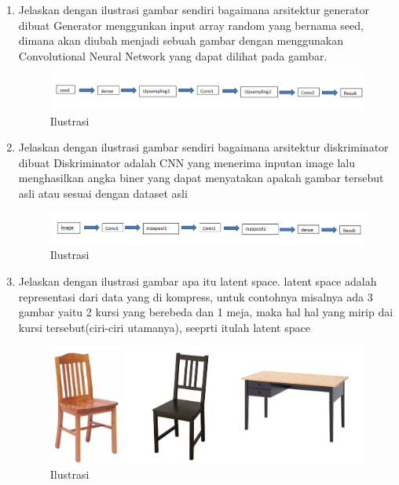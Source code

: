 \begin{enumerate}
\item Jelaskan dengan ilustrasi gambar sendiri bagaimana arsitektur generator dibuat
Generator menggunkan input array random yang bernama seed, dimana akan diubah menjadi sebuah gambar dengan menggunakan Convolutional Neural Network yang dapat dilihat pada gambar.
\begin{figure}[ht]
\centering
\includegraphics[scale=0.4]{figures/1174042/chapter8/3.PNG}
\caption{Ilustrasi}
\label{Contoh}
\end{figure}


\item Jelaskan dengan ilustrasi gambar sendiri bagaimana arsitektur diskriminator dibuat
Diskriminator adalah CNN yang menerima inputan image lalu menghasilkan angka biner yang dapat menyatakan apakah gambar tersebut asli atau sesuai dengan dataset asli
\begin{figure}[ht]
\centering
\includegraphics[scale=0.4]{figures/1174042/chapter8/4.PNG}
\caption{Ilustrasi}
\label{Contoh}
\end{figure}


\item Jelaskan dengan ilustrasi gambar apa itu latent space.
latent space adalah representasi dari data yang di kompress, untuk contohnya misalnya ada 3 gambar yaitu 2 kursi yang berebeda dan 1 meja, maka hal hal yang mirip dai kursi tersebut(ciri-ciri utamanya), seeprti itulah latent space
\begin{figure}[ht]
\centering
\includegraphics[scale=0.3]{figures/1174042/chapter8/5.PNG}
\caption{Ilustrasi}
\label{Contoh}
\end{figure}



\end{enumerate}
